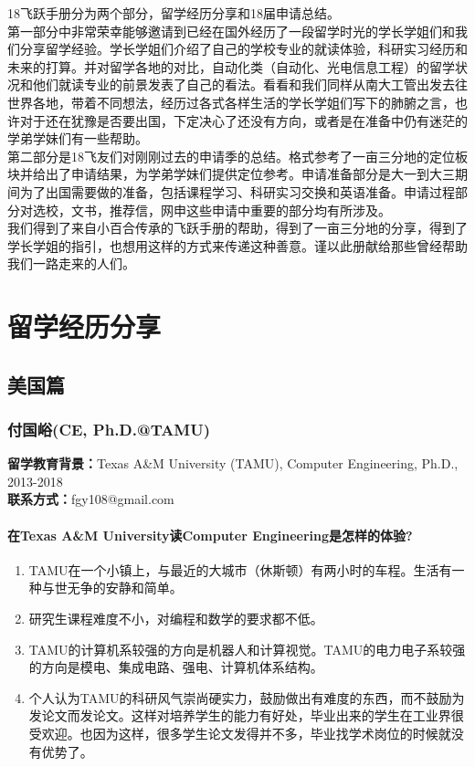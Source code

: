 \documentclass[a4paper,UTF8]{book}
\begin{document}
{\begin{spacing}{1.5}
\fontsize{12pt}{12pt}\selectfont
{
18飞跃手册分为两个部分，留学经历分享和18届申请总结。\\

第一部分中非常荣幸能够邀请到已经在国外经历了一段留学时光的学长学姐们和我们分享留学经验。学长学姐们介绍了自己的学校专业的就读体验，科研实习经历和未来的打算。并对留学各地的对比，自动化类（自动化、光电信息工程）的留学状况和他们就读专业的前景发表了自己的看法。看看和我们同样从南大工管出发去往世界各地，带着不同想法，经历过各式各样生活的学长学姐们写下的肺腑之言，也许对于还在犹豫是否要出国，下定决心了还没有方向，或者是在准备中仍有迷茫的学弟学妹们有一些帮助。\\

第二部分是18飞友们对刚刚过去的申请季的总结。格式参考了一亩三分地的定位板块并给出了申请结果，为学弟学妹们提供定位参考。申请准备部分是大一到大三期间为了出国需要做的准备，包括课程学习、科研实习交换和英语准备。申请过程部分对选校，文书，推荐信，网申这些申请中重要的部分均有所涉及。\\

我们得到了来自小百合传承的飞跃手册的帮助，得到了一亩三分地的分享，得到了学长学姐的指引，也想用这样的方式来传递这种善意。谨以此册献给那些曾经帮助我们一路走来的人们。
}
\end{spacing}
}

\clearpage

\chapter{留学经历分享}  %
\clearpage
\section{美国篇}
\subsection{付国峪(CE, Ph.D.@TAMU)}
    \textbf{留学教育背景：}Texas A\&M University (TAMU), Computer Engineering, Ph.D., 2013-2018\\
    \textbf{联系方式：}fgy108@gmail.com

    \subsubsection*{在Texas A\&M University读Computer Engineering是怎样的体验?}
        \begin{enumerate}[itemindent=0pt,itemsep=0pt,parsep=0pt]
            \item TAMU在一个小镇上，与最近的大城市（休斯顿）有两小时的车程。生活有一种与世无争的安静和简单。
            \item 研究生课程难度不小，对编程和数学的要求都不低。
            \item TAMU的计算机系较强的方向是机器人和计算视觉。TAMU的电力电子系较强的方向是模电、集成电路、强电、计算机体系结构。
            \item 个人认为TAMU的科研风气崇尚硬实力，鼓励做出有难度的东西，而不鼓励为发论文而发论文。这样对培养学生的能力有好处，毕业出来的学生在工业界很受欢迎。也因为这样，很多学生论文发得并不多，毕业找学术岗位的时候就没有优势了。
        \end{enumerate}
\end{document}
